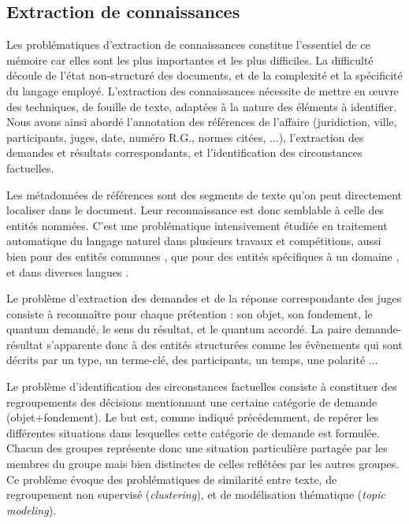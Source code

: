 \subsection{Extraction de connaissances}
\label{subsec:intro:ie}
Les problématiques d'extraction de connaissances constitue l'essentiel de ce mémoire car elles sont les plus importantes et les plus difficiles. La difficulté découle de l'état non-structuré des documents, et de la complexité et la spécificité du langage employé. L'extraction des connaissances nécessite de mettre en \oe uvre des techniques, de fouille de texte, adaptées à la nature des éléments à identifier. Nous avons ainsi abordé l'annotation des références de l'affaire (juridiction, ville, participants, juges, date, numéro R.G., normes citées, ...), l'extraction des demandes et résultats correspondants, et l'identification des circonstances factuelles.

Les métadonnées de références sont des segments de texte qu'on peut directement localiser dans le document. Leur reconnaissance est donc semblable à celle des entités nommées. C'est une problématique intensivement étudiée en traitement automatique du langage naturel \citep{yadav2018surveyNeuralNER} dans plusieurs travaux et compétitions, aussi bien pour des entités communes \citep{tjong2003introCoNLL,grishman1996muc6}, que pour des entités spécifiques à un domaine \citep{kim2004bioNer, persson2012nbbioner,hanisch2005prominer}, et dans diverses langues \citep{li2018wcpbioner,alfred2014malayner,amarappa2015kannada}. 

Le problème d'extraction des demandes et de la réponse correspondante des juges consiste à reconnaître pour chaque prétention : son objet, son fondement, le quantum demandé, le sens du résultat, et le quantum accordé. La paire demande-résultat s'apparente donc à des entités structurées comme les évènements \cite{ace2005event} qui sont décrits par un type, un terme-clé, des participants, un temps, une polarité ... 

Le problème d'identification des circonstances factuelles consiste à constituer des regroupements des décisions mentionnant une certaine catégorie de demande (objet+fondement). Le but est, comme indiqué précédemment, de repérer les différentes situations dans lesquelles cette catégorie de demande est formulée. Chacun des groupes représente donc une situation particulière partagée par les membres du groupe mais bien distinctes de celles reflétées par les autres groupes. Ce problème évoque des problématiques de similarité entre texte, de regroupement non supervisé (\textit{clustering}), et de \og modélisation thématique \fg{} (\textit{topic modeling}).

